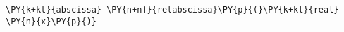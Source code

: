 \begin{Verbatim}[commandchars=\\\{\}]
    \PY{k+kt}{abscissa} \PY{n+nf}{relabscissa}\PY{p}{(}\PY{k+kt}{real} \PY{n}{x}\PY{p}{)}
\end{Verbatim}
